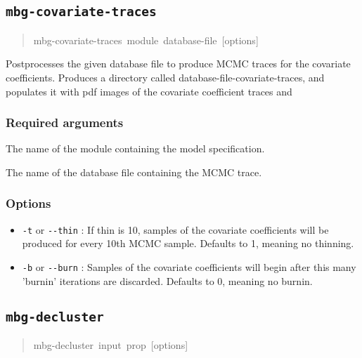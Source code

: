 \subsection{\texttt{mbg-covariate-traces}%
}
%
\begin{quote}{\ttfamily \raggedright \noindent
mbg-covariate-traces~module~database-file~{[}options{]}
}
\end{quote}

Postprocesses the given database file to produce MCMC traces for the covariate
coefficients. Produces a directory called database-file-covariate-traces, and populates
it with pdf images of the covariate coefficient traces and




\subsubsection{Required arguments%
}
\setcounter{listcnt0}{0}
\begin{list}{.}
{
\setlength{\rightmargin}{\leftmargin}
}

\item The name of the module containing the model specification.

\item The name of the database file containing the MCMC trace.
\end{list}




\subsubsection{Options%
}
%
\begin{itemize}

\item \texttt{-t} or \texttt{-{}-thin} : If thin is 10, samples of the covariate coefficients will be
produced for every 10th MCMC sample. Defaults to 1, meaning no thinning.

\item \texttt{-b} or \texttt{-{}-burn} : Samples of the covariate coefficients will begin after this
many 'burnin' iterations are discarded. Defaults to 0, meaning no burnin.

\end{itemize}




\subsection{\texttt{mbg-decluster}%
}
%
\begin{quote}{\ttfamily \raggedright \noindent
mbg-decluster~input~prop~{[}options{]}
}
\end{quote}

